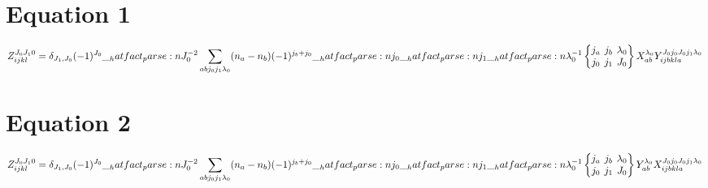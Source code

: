 \documentclass{scrartcl}
\newcommand{\sixj}[6]{\begingroup\setlength{\arraycolsep}{0.2em}\begin{Bmatrix} #1 & #2 & #3 \\ #4 & #5 & #6 \end{Bmatrix}\endgroup}
\begin{document}
\section{Equation 1}
\begin{dmath*}
Z_{i j k l}^{{J}_{0} {J}_{1} 0} = \delta_{{J}_{1},{J}_{0}} \* (-1)^{{J}_{0}} \* \hatfact{{J}_{0}^{-2}} \* \sum_{a b {j}_{0} {j}_{1} {{\lambda}}_{0}} \* (n_{a} -n_{b}) \* (-1)^{{j}_{b}+{j}_{0}} \* \hatfact{{j}_{0}} \* \hatfact{{j}_{1}} \* \hatfact{{{\lambda}}_{0}^{-1}} \* \sixj{{j}_{a}}{{j}_{b}}{{{\lambda}}_{0}}{{j}_{0}}{{j}_{1}}{{J}_{0}} \* X_{a b}^{{{\lambda}}_{0}} \* Y_{i j b k l a}^{{J}_{0} {j}_{0} {J}_{0} {j}_{1} {{\lambda}}_{0}}
\end{dmath*}

\section{Equation 2}
\begin{dmath*}
Z_{i j k l}^{{J}_{0} {J}_{1} 0} = \delta_{{J}_{1},{J}_{0}} \* (-1)^{{J}_{0}} \* \hatfact{{J}_{0}^{-2}} \* \sum_{a b {j}_{0} {j}_{1} {{\lambda}}_{0}} \* (n_{a} -n_{b}) \* (-1)^{{j}_{b}+{j}_{0}} \* \hatfact{{j}_{0}} \* \hatfact{{j}_{1}} \* \hatfact{{{\lambda}}_{0}^{-1}} \* \sixj{{j}_{a}}{{j}_{b}}{{{\lambda}}_{0}}{{j}_{0}}{{j}_{1}}{{J}_{0}} \* Y_{a b}^{{{\lambda}}_{0}} \* X_{i j b k l a}^{{J}_{0} {j}_{0} {J}_{0} {j}_{1} {{\lambda}}_{0}}
\end{dmath*}
\end{document}
